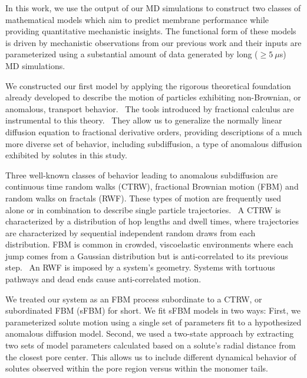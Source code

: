 \documentclass[aps,pre,preprint,groupedaddress,longbibliography]{revtex4-2}
\begin{document}
  In this work, we use the output of our MD simulations to construct two classes of 
  mathematical models which aim to predict membrane performance while providing quantitative 
  mechanistic insights. The functional form of these models is driven by mechanistic 
  observations from our previous work and their inputs are parameterized using a 
  substantial amount of data generated by long ($\geq 5~\mu$s) MD simulations. 
  
  We constructed our first model by applying the rigorous theoretical foundation 
  already developed to describe the motion of particles exhibiting non-Brownian, or
  anomalous, transport behavior.~\cite{metzler_random_2000,bouchaud_anomalous_1990}
  The tools introduced by fractional calculus are instrumental to this theory.~\cite{gorenflo_fractional_1997}
  They allow us to generalize the normally linear diffusion equation to fractional
  derivative orders, providing descriptions of a much more diverse set of behavior,
  including subdiffusion, a type of anomalous diffusion exhibited by solutes in 
  this study.~\cite{klages_anomalous_2008}

  Three well-known classes of behavior leading to anomalous subdiffusion are 
  continuous time random walks (CTRW), fractional Brownian motion
  (FBM) and random walks on fractals (RWF).\cite{meroz_toolbox_2015}
  These types of motion are frequently used alone or in combination to describe
  single particle trajectories.~\cite{morrin_three_2018,metzler_anomalous_2014}
  A CTRW is characterized by a distribution of hop lengths and dwell times, 
  where trajectories are characterized by sequential independent random draws from 
  each distribution.\cite{montroll_random_1965} FBM is common in crowded,
  viscoelastic environments where each jump comes from a Gaussian distribution
  but is anti-correlated to its previous step.~\cite{mandelbrot_fractional_1968,jeon_fractional_2010,banks_anomalous_2005}
  An RWF is imposed by a system's geometry. Systems with tortuous pathways 
  and dead ends cause anti-correlated motion.\cite{meroz_toolbox_2015,neusius_subdiffusion_2008}

  We treated our system as an FBM process subordinate to a CTRW, or subordinated 
  FBM (sFBM) for short. We fit sFBM
  models in two ways: First, we parameterized solute motion using a single set of parameters fit
  to a hypothesized anomalous diffusion model. Second, we used a two-state approach
  by extracting two sets of model parameters calculated based on a solute's radial
  distance from the closest pore center. This allows us to include different dynamical
  behavior of solutes observed within the pore region versus within the monomer tails.
  
\end{document}
